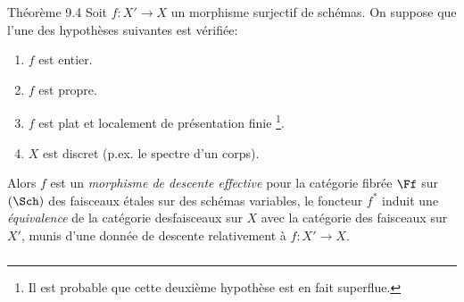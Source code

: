 \documentclass[10pt]{../fichiers-configuration-latex/smfart}
\begin{document}
\begin{enonce*}{Théorème 9.4}
Soit $f:X'\rightarrow X$ un morphisme surjectif de schémas. On suppose
que l'une des hypothèses suivantes est vérifiée:
\begin{enumerate}
\renewcommand{\theenumi}{\alph{enumi}}
\renewcommand{\labelenumi}{\theenumi)}
\item $f$ est entier.

\item $f$ est propre.

\item $f$ est plat et localement de présentation finie \footnote[1]{Il
est probable que cette deuxième hypothèse est en fait superflue.}.

\item $X$ est discret (p.ex. le spectre d'un corps).
\end{enumerate}

Alors $f$ est un \emph{morphisme de descente effective} pour la
catégorie fibrée $\Ff$ sur $(\Sch)$ des faisceaux étales
sur des schémas variables, \ie le foncteur $f^{\ast}$ induit une
\emph{équivalence} de la catégorie des\pageoriginale  faisceaux sur $X$
avec la catégorie des faisceaux sur $X'$, munis d'une donnée de
descente relativement à $f:X'\rightarrow X$.
\end{enonce*}

\setcounter{subsection}{4}
\setcounter{subsubsection}{0}
\subsubsection{}
\end{document}
